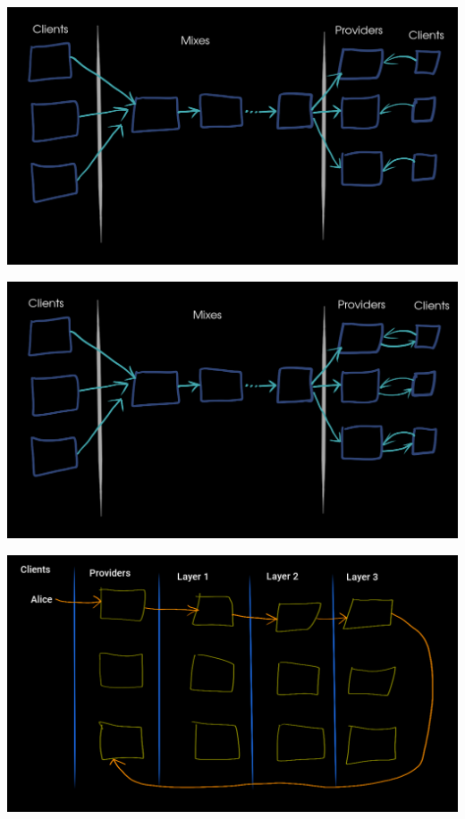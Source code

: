 \documentclass[fleqn,xcolor={usenames,dvipsnames}]{beamer} %
\begin{document}
\begin{frame}
\begin{center}
\includegraphics[scale=.24]{pics/sda5}
\end{center}
\end{frame}

\begin{frame}
\begin{center}
\includegraphics[scale=.24]{pics/sda6}
\end{center}
\end{frame}

\begin{frame}
\begin{center}
\includegraphics[scale=.24]{pics/katzenpost_loop1}
\end{center}
\end{frame}
\end{document}
